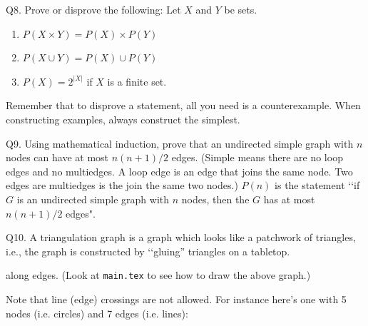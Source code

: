 \SOLUTION



\newpage
Q8. Prove or disprove the following: Let $X$ and $Y$ be sets.
\begin{enumerate}
  \item[(a)] $P(X \times Y) = P(X) \times P(Y)$
  \item[(b)] $P(X \cup Y) = P(X) \cup P(Y)$
  \item[(c)] $P(X) = 2^{|X|}$ if $X$ is a finite set.
\end{enumerate}
Remember that to disprove a statement, all you need is a
counterexample.
When constructing examples, always construct the simplest.

\SOLUTION



\newpage
Q9.
Using mathematical induction, prove that an undirected simple graph
with $n$ nodes can have at most $n(n + 1)/2$ edges.
(Simple means there are no loop edges and no multiedges.
A loop edge is an edge that joins the same node.
Two edges are multiedges is the join the same two nodes.)
$P(n)$ is the statement
\lq\lq if $G$ is an undirected simple graph with $n$ nodes, then the
$G$ has at most $n(n+1)/2$ edges".

\SOLUTION



\newpage
Q10.
A triangulation graph is a graph which looks like a patchwork of 
 triangles, i.e., 
 the graph is constructed by \lq\lq gluing'' triangles
 on a tabletop. 
\begin{center}
\end{center}
along edges.
(Look at \texttt{main.tex} to see how to draw the above graph.)

 Note that line (edge) crossings are not allowed.
 For instance here's one with 5 nodes (i.e. circles) and 7 edges (i.e. lines):
\begin{center}
\end{center}

